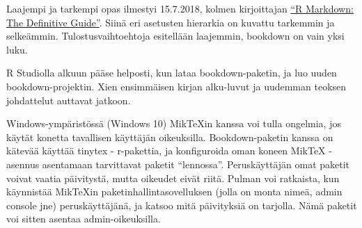 \documentclass[finnish,]{book}
\theoremstyle{definition}
\theoremstyle{definition}
\theoremstyle{definition}
\theoremstyle{remark}
\begin{document}
Laajempi ja tarkempi opas ilmestyi 15.7.2018, kolmen kirjoittajan
\href{https://bookdown.org/yihui/rmarkdown/}{``R Markdown: The
Definitive Guide''}. Siinä eri asetusten hierarkia on kuvattu tarkemmin
ja selkeämmin. Tulostusvaihtoehtoja esitellään laajemmin, bookdown on
vain yksi luku.

R Studiolla alkuun pääse helposti, kun lataa bookdown-paketin, ja luo
uuden bookdown-projektin. Xien ensimmäisen kirjan alku-luvut ja uudemman
teoksen johdattelut auttavat jatkoon.

Windows-ympäristössä (Windows 10) MikTeXin kanssa voi tulla ongelmia,
jos käytät konetta tavallisen käyttäjän oikeuksilla. Bookdown-paketin
kanssa on kätevää käyttää tinytex - r-pakettia, ja konfiguroida oman
koneen MikTeX - asennus asentamaan tarvittavat paketit ``lennossa''.
Peruskäyttäjän omat paketit voivat vaatia päivitystä, mutta oikeudet
eivät riitä. Pulman voi ratkaista, kun käynnistää MikTeXin
paketinhallintasovelluksen (jolla on monta nimeä, admin console jne)
peruskäyttäjänä, ja katsoo mitä päivityksiä on tarjolla. Nämä paketit
voi sitten asentaa admin-oikeuksilla.


\end{document}
